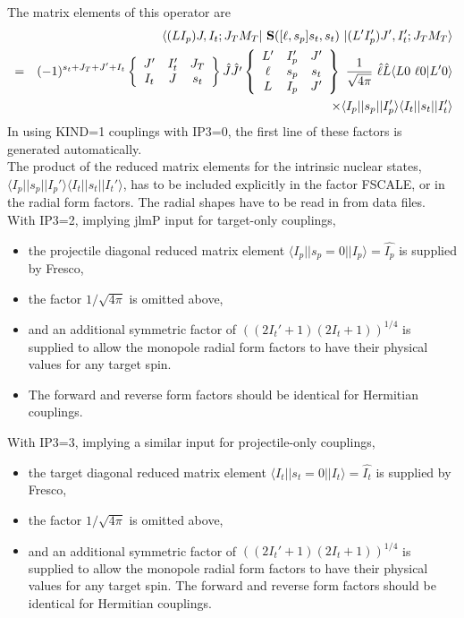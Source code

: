 \documentclass[11pt]{article}
\begin{document}
The  matrix elements of this operator are
\begin{eqnarray}
&& \langle(LI_p)J,I_t;J_TM_T | ~{\bf S}([\ell,s_p]s_t,s_t) ~| (L'I_p')J',I_t';J_TM_T \rangle
   \nonumber \\
& = &  (-1)^{s_t+J_T+J'+I_t}
   \left\{ \begin{array}{ccc}
    J'  & I_t' & J_T \\
    I_t & J    & s_t \\
    \end{array} \right\}   \hat{J} \hat{J'}
    \left\{ \begin{array}{ccc}
    L' & I_p' & J'  \\
    \ell & s_p & s_t  \\
    L & I_p & J'  \\
    \end{array} \right\}  ~
     \frac{1}{\sqrt{4\pi}} ~ \hat{\ell} \hat{L} \langle L 0 \ \ell 0 | L'0 \rangle   \nonumber \\
    &  &   \times \langle I_p||s_p||I_p'\rangle \langle I_t||s_t||I_t'\rangle
\end{eqnarray}
In using KIND=1 couplings with IP3=0, the first line of these factors is generated automatically. \\
The product of the
reduced matrix elements for the intrinsic nuclear states,
$\langle I_p||s_p||I_p'\rangle \langle I_t||s_t||I_t'\rangle$,
 has to be included explicitly in the factor FSCALE,
 or in the radial form factors.
The radial shapes have to be read in from data files.\\

With IP3=2, implying jlmP input for target-only couplings,
\begin{itemize}
\item
 the projectile diagonal reduced matrix element
$\langle I_p||s_p=0||I_p\rangle = \hat{I_p}$ is supplied by Fresco,
\item
the factor $1/\sqrt{4\pi}$ is omitted above,
\item
and an additional symmetric factor of
$((2I_t'+1)(2I_t+1))^{1/4}$
is supplied to allow the
monopole radial form factors to have their physical
values for any target spin.
\item
The forward and reverse form factors should be identical for Hermitian couplings.

\end{itemize}
With IP3=3, implying a similar input for projectile-only couplings,
\begin{itemize}
\item
 the target diagonal reduced matrix element
 $\langle I_t||s_t=0||I_t\rangle = \hat{I_t}$ is supplied by Fresco,
 \item
 the factor $1/\sqrt{4\pi}$ is omitted above,
 \item
 and an additional symmetric factor of $((2I_t'+1)(2I_t+1))^{1/4}$
 is supplied to allow the monopole radial form factors to have their physical
 values for any target spin.
 The forward and reverse form factors should be identical for Hermitian couplings.
\end{itemize}
\end{document}
